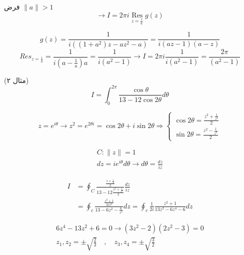 فرض
$\|a\|>1$
\[
\rightarrow I = 2\pi i \underset{z = \frac{1}{a}}{\text{ Res }} g(z) 
\]

\begin{equation*}
	g(z) = \frac {1}{i(\left(1+a^{2}\right) z-a z^{2}-a)}= \frac {1}{i(az-1)(a-z)}
\end{equation*}
\begin{equation*}
	Res_{z=\frac{1}{a}} = \frac{1}{i(a-\frac{1}{a})a}=\frac{1}{i(a^{2}-1)} \rightarrow I=2\pi i \frac{1}{i(a^{2}-1)}=\frac{2\pi}{(a^{2}-1)}
\end{equation*}

\example (مثال ۲)
\begin{equation*}
I=\int_{0}^{2 \pi} \frac{\cos \theta}{13-12 \cos 2 \theta} d \theta
\end{equation*}

\[
z=e^{i \theta}
\rightarrow z^{2}=e^{2 \theta i}=\cos 2 \theta+i \sin 2 \theta
\Rightarrow 
\begin{cases}
\cos 2 \theta=\frac{z^{2}+\frac{1}{z^{2}}}{2} \\ 
\sin 2 \theta=\frac{z^{2}-\frac{1}{z^{2}}}{2}
\end{cases}
\]
\begin{center}
\begin{equation*}
	\begin{split}
		C :\|z\|=1 \\ 
		dz=ie^{i \theta} d \theta \rightarrow d\theta = \frac{dz}{iz}
	\end{split}
\end{equation*}
\end{center}
\begin{align*}
	I&=\oint_{C} \frac{\frac{z+\frac{1}{z}}{2}}{13-12 \frac{z^{2}+\frac{1}{z^{2}}}{2}} \frac{dz}{iz} \\
	&=\oint_{c} \frac{\frac{z^{2}+1}{2 i z^{2}}}{13-6 z^{2}-\frac{6}{z^{2}}} d z=\oint_{c} \frac{1}{2 i} \frac{z^{2}+1}{13 z^{2}-6 z^{4}-6} d z
\end{align*}

\begin{equation*}
	\begin{split}
		6 z^{4}-13 z^{2}+6=0 \longrightarrow\left(3 z^{2}-2\right)\left(2 z^{2}-3\right)=0	 \\
		z_{1}, z_{2}=\pm \sqrt{\frac{2}{3}} \quad , \quad z_{3}, z_{4}=\pm \sqrt{\frac{3} {2}}	
	\end{split}
\end{equation*}


